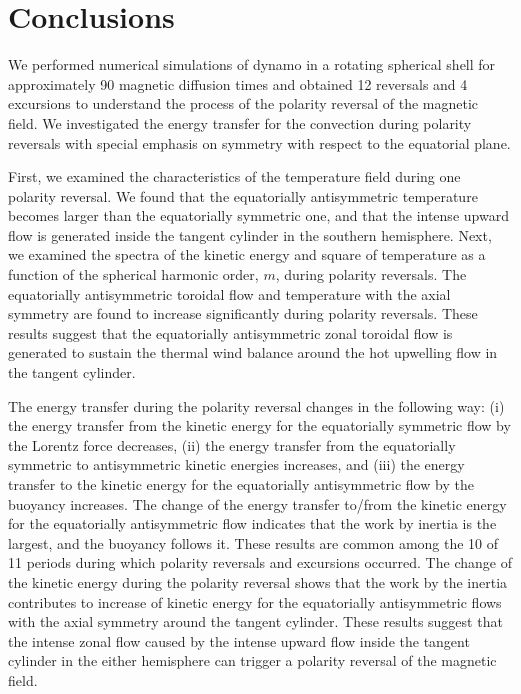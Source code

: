 \section{Conclusions}
\label{section:conclusions}

We performed numerical simulations of dynamo in a rotating spherical shell for approximately 90 magnetic diffusion times and obtained 12 reversals and 4 excursions to understand the process of the polarity reversal of the magnetic field. 
We investigated the energy transfer for the convection during polarity reversals with special emphasis on symmetry with respect to the equatorial plane.

First, we examined the characteristics of the temperature field during one polarity reversal. 
We found that the equatorially antisymmetric temperature becomes larger than the equatorially symmetric one, and that the intense upward flow is generated inside the tangent cylinder in the southern hemisphere. 
Next, we examined the spectra of the kinetic energy and square of temperature as a function of the spherical harmonic order, $m$, during polarity reversals. 
The equatorially antisymmetric toroidal flow and temperature with the axial symmetry are found to increase significantly during polarity reversals.
These results suggest that the equatorially antisymmetric zonal toroidal flow is generated to sustain the thermal wind balance around the hot upwelling flow in the tangent cylinder.

The energy transfer during the polarity reversal changes in the following way: 
(i) the energy transfer from the kinetic energy for the equatorially symmetric flow by the Lorentz force decreases, 
(ii) the energy transfer from the equatorially symmetric to antisymmetric kinetic energies increases, and (iii) the energy transfer to the kinetic energy for the equatorially antisymmetric flow by the buoyancy increases. 
The change of the energy transfer to/from the kinetic energy for the equatorially antisymmetric flow indicates that the work by inertia is the largest, and the buoyancy follows it. 
These results are common among the 10 of 11 periods during which polarity reversals and excursions occurred. 
The change of the kinetic energy during the polarity reversal shows that the work by the inertia contributes to increase of kinetic energy for the equatorially antisymmetric flows with the axial symmetry around the tangent cylinder. 
These results suggest that the intense zonal flow caused by the intense upward flow inside the tangent cylinder in the either hemisphere can trigger a polarity reversal of the magnetic field.

